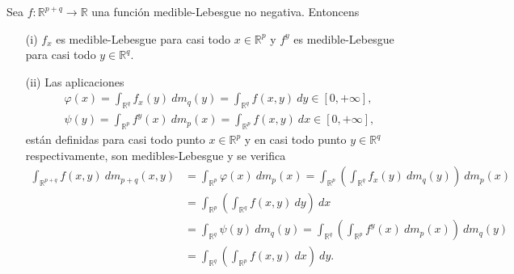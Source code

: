 \begin{teo}
    Sea $f: \mathbb{R}^{p+q} \longrightarrow \mathbb{R}$ una función medible-Lebesgue no negativa. Entoncens
    \begin{enumerate}
        \item[(i)] $f_x$ es medible-Lebesgue para casi todo $x \in \mathbb{R}^p$ y $f^y$ es medible-Lebesgue para casi todo $y \in \mathbb{R}^q$.
        \item[(ii)] Las aplicaciones
              \begin{align*}
                  \varphi(x) = \int_{\mathbb{R}^q}{f_x(y) \ dm_q(y)} = \int_{\mathbb{R}^q}{f(x,y) \ dy} \in [0,+\infty], \\
                  \psi(y) = \int_{\mathbb{R}^p}{f^y(x) \ dm_p(x)} = \int_{\mathbb{R}^p}{f(x,y) \ dx} \in [0,+\infty],
              \end{align*}
              están definidas para casi todo punto $x \in \mathbb{R}^{p}$ y en casi todo punto $y \in \mathbb{R}^{q}$ respectivamente, son medibles-Lebesgue y se verifica
              \begin{align*}
                  \int_{\mathbb{R}^{p+q}}{f(x,y) \ dm_{p+q}(x,y)} & = \int_{\mathbb{R}^p}{\varphi(x) \ dm_p(x)} = \int_{\mathbb{R}^p}\left( \int_{\mathbb{R}^q}{f_x(y) \ dm_q(y)} \right) \ dm_p(x) \\
                                                                  & = \int_{\mathbb{R}^p}\left( \int_{\mathbb{R}^q}{f(x,y) \ dy} \right) \ dx                                                       \\
                                                                  & = \int_{\mathbb{R}^q}{\psi(y) \ dm_q(y)} = \int_{\mathbb{R}^q}\left( \int_{\mathbb{R}^p}{f^y(x) \ dm_p(x)} \right) \ dm_q(y)    \\
                                                                  & = \int_{\mathbb{R}^q}\left( \int_{\mathbb{R}^p}{f(x,y) \ dx} \right) \ dy.
              \end{align*}
    \end{enumerate}
\end{teo}

